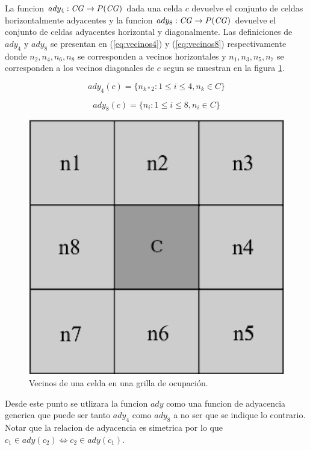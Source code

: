 La funcion $ady_4 : \mathit{CG} \rightarrow P(\mathit{CG})$ dada una celda $c$ devuelve el conjunto
de celdas horizontalmente adyacentes y la funcion $ady_8 : \mathit{CG} \rightarrow P(\mathit{CG})$
devuelve el conjunto de celdas adyacentes horizontal y diagonalmente. Las
definiciones de $ady_4$ y $ady_8$ se presentan en (\ref{eq:vecinos4}) y
(\ref{eq:vecinos8}) respectivamente donde $n_2, n_4, n_6, n_8$ se corresponden
a vecinos horizontales y $n_1, n_3, n_5, n_7$ se corresponden a los vecinos
diagonales de $c$ segun se muestran en la figura \ref{fig:vecinos}.

\begin{equation} 
 ady_4(c)=\{n_{k*2} : 1\leq i \leq 4, n_k \in C\}
 \label{eq:vecinos4}
\end{equation} 

\begin{equation} 
 ady_8(c)=\{n_i : 1\leq i \leq 8, n_i \in C\}
 \label{eq:vecinos8}
\end{equation} 

\begin{figure}[H]
  \center
  \includegraphics[width=0.3\linewidth]{imagenes/vecinosSharp.png}
  \caption[Vecinos de una celda en una grilla de ocupación.]{Vecinos de una celda en una grilla de ocupación.}
  \label{fig:vecinos}
\end{figure} 

Desde este punto se utlizara la funcion $ady$ como una funcion de adyacencia
generica que puede ser tanto $ady_4$ como $ady_8$ a no ser que se indique lo
contrario.
Notar que la relacion de adyacencia es simetrica por lo que $c_1 \in ady(c_2)
\Leftrightarrow c_2 \in ady(c_1)$.

